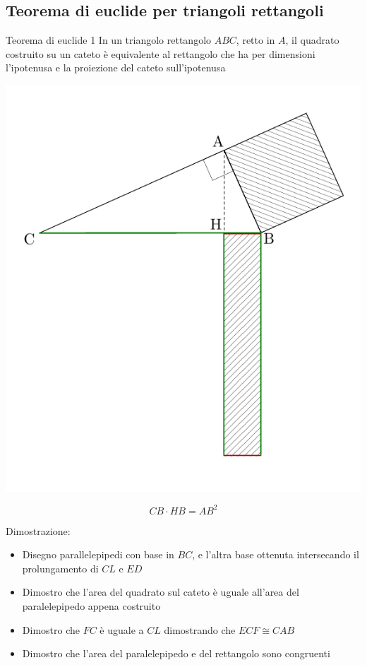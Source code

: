 \subsection{Teorema di euclide per triangoli rettangoli}
\begin{teorema}{Teorema di euclide 1}
	In un triangolo rettangolo $ ABC $, retto in $ A $, il quadrato costruito su un cateto è equivalente al rettangolo che ha per dimensioni l’ipotenusa e la proiezione del cateto sull’ipotenusa
	\begin{center}
		\includegraphics{Images/Euclide 1.pdf }
	\end{center}
	\[
		CB \cdot HB = AB^2
	\]
	\vskip3mm
\end{teorema}
Dimostrazione:
\begin{itemize}
	\item Disegno parallelepipedi con base in $ BC $, e l'altra base ottenuta intersecando il prolungamento di $ CL $ e $ ED $
	\item Dimostro che l'area del quadrato sul cateto è uguale all'area del paralelepipedo appena costruito
	\item Dimostro che $ FC $ è uguale a $ CL $ dimostrando che $ ECF \cong  CAB $
	\item Dimostro che l'area del paralelepipedo e del rettangolo sono congruenti
\end{itemize}
